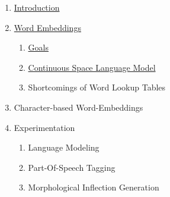 \documentclass[11pt, a4paper, landscape]{article}
\begin{document}
\TitlePage

\NewPage{}
\small
\vfill
\begin{enumerate}
\item \hyperlink{sli:introduction}{Introduction}
\item \hyperlink{sli:word-embeddings}{Word Embeddings}
\begin{enumerate}
\item \hyperlink{sli:goals}{Goals}
\item \hyperlink{sli:simple}{Continuous Space Language Model}
\item Shortcomings of Word Lookup Tables
\end{enumerate}
\item Character-based Word-Embeddings
\item Experimentation
\begin{enumerate}
\item Language Modeling
\item Part-Of-Speech Tagging
\item Morphological Inflection Generation
\end{enumerate}

\end{enumerate}
\vfill
\normalsize
\vfill
\end{document}
